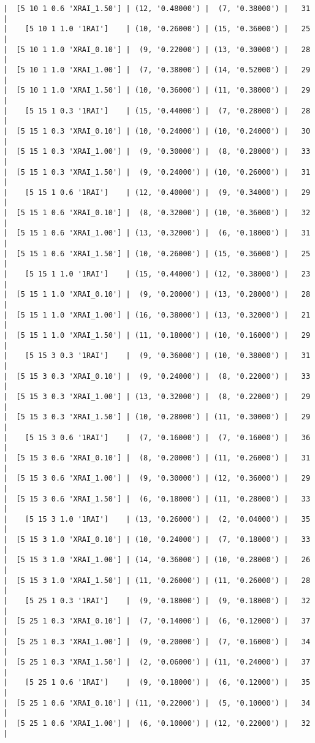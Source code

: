 \documentclass{article}
\begin{document}
\begin{verbatim}
|  [5 10 1 0.6 'XRAI_1.50'] | (12, '0.48000') |  (7, '0.38000') |   31  |
|    [5 10 1 1.0 '1RAI']    | (10, '0.26000') | (15, '0.36000') |   25  |
|  [5 10 1 1.0 'XRAI_0.10'] |  (9, '0.22000') | (13, '0.30000') |   28  |
|  [5 10 1 1.0 'XRAI_1.00'] |  (7, '0.38000') | (14, '0.52000') |   29  |
|  [5 10 1 1.0 'XRAI_1.50'] | (10, '0.36000') | (11, '0.38000') |   29  |
|    [5 15 1 0.3 '1RAI']    | (15, '0.44000') |  (7, '0.28000') |   28  |
|  [5 15 1 0.3 'XRAI_0.10'] | (10, '0.24000') | (10, '0.24000') |   30  |
|  [5 15 1 0.3 'XRAI_1.00'] |  (9, '0.30000') |  (8, '0.28000') |   33  |
|  [5 15 1 0.3 'XRAI_1.50'] |  (9, '0.24000') | (10, '0.26000') |   31  |
|    [5 15 1 0.6 '1RAI']    | (12, '0.40000') |  (9, '0.34000') |   29  |
|  [5 15 1 0.6 'XRAI_0.10'] |  (8, '0.32000') | (10, '0.36000') |   32  |
|  [5 15 1 0.6 'XRAI_1.00'] | (13, '0.32000') |  (6, '0.18000') |   31  |
|  [5 15 1 0.6 'XRAI_1.50'] | (10, '0.26000') | (15, '0.36000') |   25  |
|    [5 15 1 1.0 '1RAI']    | (15, '0.44000') | (12, '0.38000') |   23  |
|  [5 15 1 1.0 'XRAI_0.10'] |  (9, '0.20000') | (13, '0.28000') |   28  |
|  [5 15 1 1.0 'XRAI_1.00'] | (16, '0.38000') | (13, '0.32000') |   21  |
|  [5 15 1 1.0 'XRAI_1.50'] | (11, '0.18000') | (10, '0.16000') |   29  |
|    [5 15 3 0.3 '1RAI']    |  (9, '0.36000') | (10, '0.38000') |   31  |
|  [5 15 3 0.3 'XRAI_0.10'] |  (9, '0.24000') |  (8, '0.22000') |   33  |
|  [5 15 3 0.3 'XRAI_1.00'] | (13, '0.32000') |  (8, '0.22000') |   29  |
|  [5 15 3 0.3 'XRAI_1.50'] | (10, '0.28000') | (11, '0.30000') |   29  |
|    [5 15 3 0.6 '1RAI']    |  (7, '0.16000') |  (7, '0.16000') |   36  |
|  [5 15 3 0.6 'XRAI_0.10'] |  (8, '0.20000') | (11, '0.26000') |   31  |
|  [5 15 3 0.6 'XRAI_1.00'] |  (9, '0.30000') | (12, '0.36000') |   29  |
|  [5 15 3 0.6 'XRAI_1.50'] |  (6, '0.18000') | (11, '0.28000') |   33  |
|    [5 15 3 1.0 '1RAI']    | (13, '0.26000') |  (2, '0.04000') |   35  |
|  [5 15 3 1.0 'XRAI_0.10'] | (10, '0.24000') |  (7, '0.18000') |   33  |
|  [5 15 3 1.0 'XRAI_1.00'] | (14, '0.36000') | (10, '0.28000') |   26  |
|  [5 15 3 1.0 'XRAI_1.50'] | (11, '0.26000') | (11, '0.26000') |   28  |
|    [5 25 1 0.3 '1RAI']    |  (9, '0.18000') |  (9, '0.18000') |   32  |
|  [5 25 1 0.3 'XRAI_0.10'] |  (7, '0.14000') |  (6, '0.12000') |   37  |
|  [5 25 1 0.3 'XRAI_1.00'] |  (9, '0.20000') |  (7, '0.16000') |   34  |
|  [5 25 1 0.3 'XRAI_1.50'] |  (2, '0.06000') | (11, '0.24000') |   37  |
|    [5 25 1 0.6 '1RAI']    |  (9, '0.18000') |  (6, '0.12000') |   35  |
|  [5 25 1 0.6 'XRAI_0.10'] | (11, '0.22000') |  (5, '0.10000') |   34  |
|  [5 25 1 0.6 'XRAI_1.00'] |  (6, '0.10000') | (12, '0.22000') |   32  |

\end{verbatim}
\end{document}
